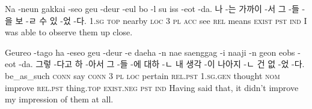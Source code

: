\begin{example}
\tgl
		{Na -neun gakkai -seo geu -deur -eul bo -l su iss -eot -da.}
		{나 -는 가까이 -서 그 -들 -을 보 -ㄹ 수 있 -었 -다.}
		{\textsc{1.sg}	\textsc{top}	nearby	\textsc{loc}	\textsc{3}	\textsc{pl}	\textsc{acc}	see	\textsc{rel}	means	\textsc{exist}	\textsc{pst}	\textsc{ind}}
		{I was able to observe them up close.}
\end{example}

\begin{example}
\tgl
		{Geureo -tago ha -eseo geu -deur -e daeha -n nae saenggag -i naaji -n geon eobs -eot -da.}
		{그렇 -다고 하 -아서 그 -들 -에 대하 -ㄴ 내 생각 -이 나아지 -ㄴ 건 없 -었 -다.}
		{be\_as\_such	\textsc{conn}	say	\textsc{conn}	\textsc{3}	\textsc{pl}	\textsc{loc}	pertain	\textsc{rel.pst}	\textsc{1.sg.gen}	thought	\textsc{nom}	improve	\textsc{rel.pst}	thing.\textsc{top}	\textsc{exist.neg}	\textsc{pst}	\textsc{ind}}
		{Having said that, it didn't improve my impression of them at all.}
\end{example}

\pagebreak